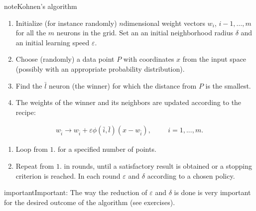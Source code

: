 \documentclass[letterpaper,10pt,english]{jupyterBook}
\begin{document}
\begin{sphinxadmonition}{note}{Kohnen’s algorithm}
\begin{enumerate}
%
\item {} 
\sphinxAtStartPar
Initialize (for instance randomly) \(n\)\sphinxhyphen{}dimensional weight vectors \(w_i\), \(i-1,\dots,m\) for all the \(m\) neurons in the grid. Set an an initial neighborhood radius \( \delta \) and an initial learning speed \( \varepsilon \).

\item {} 
\sphinxAtStartPar
Choose (randomly) a data point \(P\) with coordinates \(x\) from the input space (possibly with an appropriate probability distribution).

\item {} 
\sphinxAtStartPar
Find the \( \bar {l} \) neuron (the winner) for which the distance from \(P\) is the smallest.

\item {} 
\sphinxAtStartPar
The weights of the winner and its neighbors are updated according to the  recipe:

\end{enumerate}
\begin{equation*}
\begin{split}w_{\bar{i}} \to w_{\bar{i}} + \varepsilon \phi(\bar{i}, \bar{l})(x - w_{\bar{i}}), \hspace{1cm} i=1, . . . , m. 
\end{split}
\end{equation*}\begin{enumerate}
%
\item {} 
\sphinxAtStartPar
Loop from \(1.\) for a specified number of points.

\item {} 
\sphinxAtStartPar
Repeat from \(1.\) in rounds, until a satisfactory result is obtained or a stopping criterion is reached. In each round   \( \varepsilon \) and \( \delta \) according to a chosen policy.

\end{enumerate}
\end{sphinxadmonition}

\begin{sphinxadmonition}{important}{Important:}
\sphinxAtStartPar
The way the reduction of \( \varepsilon \) and \( \delta \) is done is very important for the desired outcome of the algorithm (see exercises).
\end{sphinxadmonition}
\end{document}
